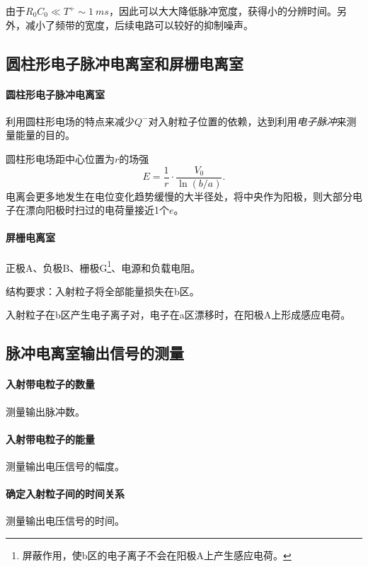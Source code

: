 由于$R_0C_0 \ll T^+ \sim \qty{1}{ms}$，因此可以大大降低脉冲宽度，获得小的分辨时间。另外，减小了频带的宽度，后续电路可以较好的抑制噪声。

\subsection{圆柱形电子脉冲电离室和屏栅电离室}

\paragraph{圆柱形电子脉冲电离室}
利用圆柱形电场的特点来减少$Q^-$对入射粒子位置的依赖，达到利用\textit{电子脉冲}来测量能量的目的。

圆柱形电场距中心位置为$r$的场强
\begin{equation}\label{eq:nrd-cylindrical-detector-field}
	E = \frac1r \cdot \frac{V_0}{\ln(b/a)}.
\end{equation}
电离会更多地发生在电位变化趋势缓慢的大半径处，将中央作为阳极，则大部分电子在漂向阳极时扫过的电荷量接近1个$e$。
\paragraph{屏栅电离室}
正极A、负极B、栅极G\footnote{屏蔽作用，使b区的电子离子不会在阳极A上产生感应电荷。}、电源和负载电阻。
\begin{notecaptionblock}
\end{notecaptionblock}
结构要求：入射粒子将全部能量损失在b区。

入射粒子在b区产生电子离子对，电子在a区漂移时，在阳极A上形成感应电荷。

\subsection{脉冲电离室输出信号的测量}

\paragraph{入射带电粒子的数量}
测量输出脉冲数。
\paragraph{入射带电粒子的能量}
测量输出电压信号的幅度。
\paragraph{确定入射粒子间的时间关系}
测量输出电压信号的时间。

